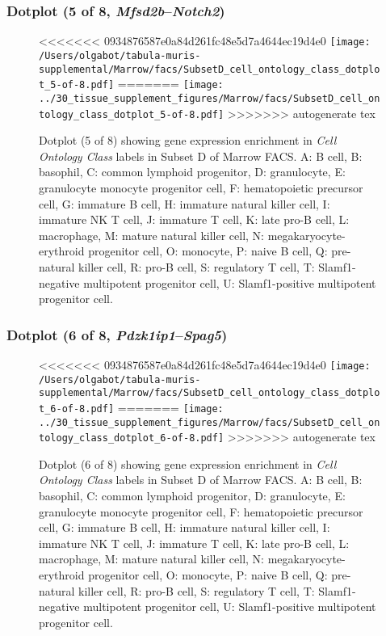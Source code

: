 \clearpage

\subsubsection{Dotplot (5 of 8, \emph{Mfsd2b}--\emph{Notch2})}
\begin{figure}[h]
\centering
<<<<<<< 0934876587e0a84d261fc48e5d7a4644ec19d4e0
\texttt{[image: /Users/olgabot/tabula-muris-supplemental/Marrow/facs/SubsetD\_cell\_ontology\_class\_dotplot\_5-of-8.pdf]}
=======
\texttt{[image: ../30\_tissue\_supplement\_figures/Marrow/facs/SubsetD\_cell\_ontology\_class\_dotplot\_5-of-8.pdf]}
>>>>>>> autogenerate tex

\caption{ Dotplot (5 of 8)  showing gene expression enrichment in \emph{Cell Ontology Class} labels in Subset D of Marrow FACS. A: B cell, B: basophil, C: common lymphoid progenitor, D: granulocyte, E: granulocyte monocyte progenitor cell, F: hematopoietic precursor cell, G: immature B cell, H: immature natural killer cell, I: immature NK T cell, J: immature T cell, K: late pro-B cell, L: macrophage, M: mature natural killer cell, N: megakaryocyte-erythroid progenitor cell, O: monocyte, P: naive B cell, Q: pre-natural killer cell, R: pro-B cell, S: regulatory T cell, T: Slamf1-negative multipotent progenitor cell, U: Slamf1-positive multipotent progenitor cell.}
\end{figure}


\clearpage

\subsubsection{Dotplot (6 of 8, \emph{Pdzk1ip1}--\emph{Spag5})}
\begin{figure}[h]
\centering
<<<<<<< 0934876587e0a84d261fc48e5d7a4644ec19d4e0
\texttt{[image: /Users/olgabot/tabula-muris-supplemental/Marrow/facs/SubsetD\_cell\_ontology\_class\_dotplot\_6-of-8.pdf]}
=======
\texttt{[image: ../30\_tissue\_supplement\_figures/Marrow/facs/SubsetD\_cell\_ontology\_class\_dotplot\_6-of-8.pdf]}
>>>>>>> autogenerate tex

\caption{ Dotplot (6 of 8)  showing gene expression enrichment in \emph{Cell Ontology Class} labels in Subset D of Marrow FACS. A: B cell, B: basophil, C: common lymphoid progenitor, D: granulocyte, E: granulocyte monocyte progenitor cell, F: hematopoietic precursor cell, G: immature B cell, H: immature natural killer cell, I: immature NK T cell, J: immature T cell, K: late pro-B cell, L: macrophage, M: mature natural killer cell, N: megakaryocyte-erythroid progenitor cell, O: monocyte, P: naive B cell, Q: pre-natural killer cell, R: pro-B cell, S: regulatory T cell, T: Slamf1-negative multipotent progenitor cell, U: Slamf1-positive multipotent progenitor cell.}
\end{figure}


